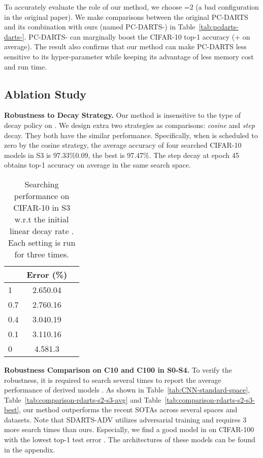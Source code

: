 \documentclass{article} \usepackage{iclr2021_conference,times}
\begin{document}
To accurately evaluate the role of our method, we choose =2 (a bad configuration in the original paper). We make comparisons between the original PC-DARTS and its combination with ours (named PC-DARTS-) in Table~\ref{tab:pcdarts-darts-}. PC-DARTS- can marginally boost the CIFAR-10 top-1 accuracy (+ on average). The result also confirms that our method can make PC-DARTS less sensitive to its hyper-parameter  while keeping its advantage of less memory cost and run time. 


\subsection{Ablation Study}\label{sec:ablation}

\textbf{Robustness to Decay Strategy.} Our method is insensitive to the type of decay policy on . We design extra two strategies as comparisons: \emph{cosine} and \emph{step} decay. They both have the similar performance. Specifically, when  is scheduled to zero by the cosine strategy, the average accuracy of four searched CIFAR-10 models in S3  is 97.33\%0.09, the best is 97.47\%.  The step decay at epoch 45 obtains  top-1 accuracy on average in the same search space.   


\begin{wraptable}{r}{5cm}
\vspace{-23pt}
\caption{Searching performance on CIFAR-10 in S3 w.r.t the initial linear decay rate . Each setting is run for three times.}
\smallskip
	\centering
	\smallskip\begin{tabular}{l*{2}{c}}
		\toprule
 & Error (\%) \\
    				\midrule
    				1  & 2.650.04 \\
    				0.7 & 2.760.16 \\
    				0.4 &3.040.19 \\
    				0.1   & 3.110.16\\
    				0   & 4.581.3 \\
		\bottomrule
	\end{tabular}
	\label{tab:beta-sensitiveness}
	\vspace{-20pt}
\end{wraptable}


\textbf{Robustness Comparison on C10 and C100 in S0-S4.}
To verify the robustness, it is required to search several times to report the average performance of derived models \citep{Yu2020Evaluating,yang2020nas}.  As shown in Table~\ref{tab:CNN-standard-space}, Table~\ref{tab:comparison-rdarts-s2-s3-avg} and Table~\ref{tab:comparison-rdarts-s2-s3-best}, our method outperforms the recent SOTAs across several spaces and datasets. Note that SDARTS-ADV  utilizes adversarial training and requires 3 more search times than ours. Especially, we find a good model in  on CIFAR-100 with the lowest top-1 test error  . The architectures of these models can be found in the appendix. 
\end{document}
